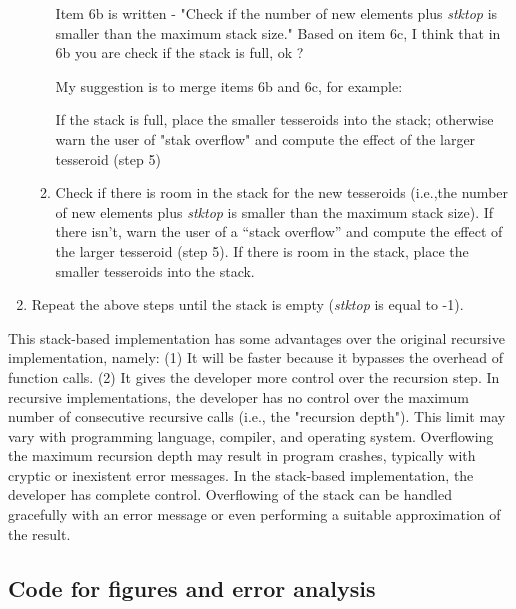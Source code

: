 \documentclass[paper,twocolumn,twoside]{geophysics}
\begin{document}
\begin{enumerate}
\begin{enumerate}
{Item 6b is written - "Check if the number of new elements plus \emph{stktop} is smaller than the maximum stack size."
Based on item 6c, I think that in 6b you are check if the stack is full, ok ?

My suggestion is to merge items 6b and 6c, for example:

If the stack is full, place the smaller tesseroids into the stack; otherwise warn the user of "stak overflow" and compute the effect of the larger tesseroid (step 5)

}

        \item Check if there is room in the stack
            for the new tesseroids
            (i.e.,the number of new elements plus \emph{stktop}
             is smaller than the maximum stack size).
             If there isn't,
             warn the user of a ``stack overflow''
             and compute the effect of the larger tesseroid (step 5).
             If there is room in the stack,
             place the smaller tesseroids into
             the stack.
    \end{enumerate}
    \item Repeat the above steps until the stack is empty
        (\emph{stktop} is equal to -1).
\end{enumerate}

This stack-based implementation
has some advantages over the original recursive implementation,
namely:
(1) It will be faster because it bypasses the overhead of function calls.
(2) It gives the developer more control over the recursion step.
In recursive implementations,
the developer has no control over
the maximum number of consecutive recursive calls
(i.e., the "recursion depth").
This limit may vary with programming language,
compiler, and operating system.
Overflowing the maximum recursion depth
may result in program crashes,
typically with cryptic or inexistent error messages.
In the stack-based implementation,
the developer has complete control.
Overflowing of the stack can be handled gracefully
with an error message
or even performing a suitable approximation of the result.

\subsection{Code for figures and error analysis}
\end{document}
